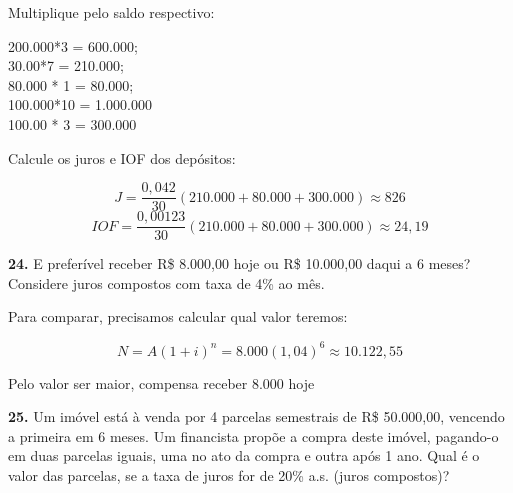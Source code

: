 \documentclass[12pt,a4paper]{article}
\begin{document}
Multiplique pelo saldo respectivo:
\begin{center}
  200.000*3 = 600.000; \\ 30.00*7 = 210.000; \\
  80.000 * 1 = 80.000; \\ 100.000*10 = 1.000.000 \\
  100.00 * 3 = 300.000
\end{center}

Calcule os juros e IOF dos depósitos:

\[
  J = \frac{0,042}{30} (210.000+80.000+300.000) \approx 826
\]
\[
  IOF = \frac{0,00123}{30} ( 210.000 + 80.000 + 300.000 ) \approx 24,19
\]


\textbf{24.} E preferível receber R\$ 8.000,00 hoje ou R\$ 10.000,00 daqui a 6 meses? Considere
juros compostos com taxa de 4\% ao mês.

Para comparar, precisamos calcular qual valor teremos:

\[
  N = A ( 1 + i )^n = 8.000 (1,04)^6 \approx 10.122,55
\]

Pelo valor ser maior, compensa receber 8.000 hoje
\vspace*{.5cm}

\textbf{25.} Um imóvel está à venda por 4 parcelas semestrais de R\$ 50.000,00, vencendo a
primeira em 6 meses. Um financista propõe a compra deste imóvel, pagando-o em duas
parcelas iguais, uma no ato da compra e outra após 1 ano. Qual é o valor das parcelas,
se a taxa de juros for de 20\% a.s. (juros compostos)?
\end{document}
